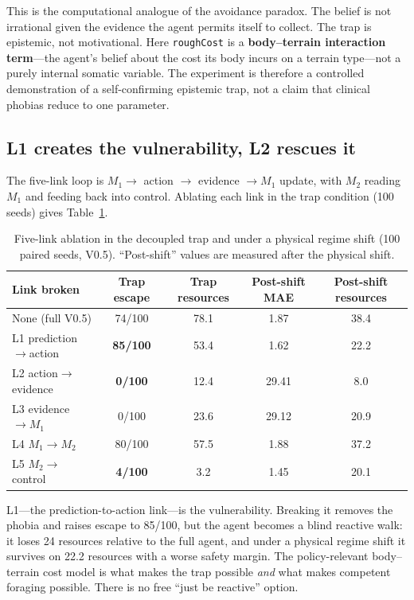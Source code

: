 \documentclass[11pt,a4paper]{article}
\begin{document}
This is the computational analogue of the avoidance paradox. The belief is not irrational given the evidence the agent permits itself to collect. The trap is epistemic, not motivational. Here \texttt{roughCost} is a \textbf{body--terrain interaction term}---the agent's belief about the cost its body incurs on a terrain type---not a purely internal somatic variable. The experiment is therefore a controlled demonstration of a self-confirming epistemic trap, not a claim that clinical phobias reduce to one parameter.

\subsection{L1 creates the vulnerability, L2 rescues it}

The five-link loop is $M_1\rightarrow$ action $\rightarrow$ evidence $\rightarrow M_1$ update, with $M_2$ reading $M_1$ and feeding back into control. Ablating each link in the trap condition (100 seeds) gives Table~\ref{tab:links}.

\begin{table}[t]
\centering
\small
\caption{Five-link ablation in the decoupled trap and under a physical regime shift (100 paired seeds, V0.5). ``Post-shift'' values are measured after the physical shift.}
\label{tab:links}
\begin{tabular}{lcccc}
\toprule
Link broken & Trap escape & Trap resources & Post-shift MAE & Post-shift resources \\
\midrule
None (full V0.5) & 74/100 & 78.1 & 1.87 & 38.4 \\
L1 prediction$\rightarrow$action & \textbf{85/100} & 53.4 & 1.62 & 22.2 \\
L2 action$\rightarrow$evidence & \textbf{0/100} & 12.4 & 29.41 & 8.0 \\
L3 evidence$\rightarrow M_1$ & 0/100 & 23.6 & 29.12 & 20.9 \\
L4 $M_1\rightarrow M_2$ & 80/100 & 57.5 & 1.88 & 37.2 \\
L5 $M_2\rightarrow$control & \textbf{4/100} & 3.2 & 1.45 & 20.1 \\
\bottomrule
\end{tabular}
\end{table}

L1---the prediction-to-action link---is the vulnerability. Breaking it removes the phobia and raises escape to 85/100, but the agent becomes a blind reactive walk: it loses 24 resources relative to the full agent, and under a physical regime shift it survives on 22.2 resources with a worse safety margin. The policy-relevant body--terrain cost model is what makes the trap possible \emph{and} what makes competent foraging possible. There is no free ``just be reactive'' option.
\end{document}
